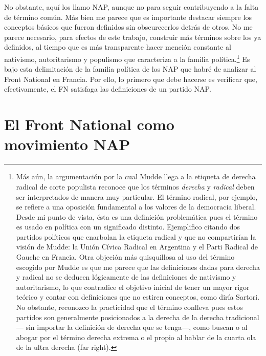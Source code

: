 No obstante, aquí los llamo NAP, aunque no para seguir contribuyendo a la falta de término común. Más bien me parece que es importante destacar siempre los conceptos básicos que fueron definidos sin obscurecerlos detrás de otros. No me parece necesario, para efectos de este trabajo, construir más términos sobre los ya definidos, al tiempo que es más transparente hacer mención constante al nativismo, autoritarismo y populismo que caracteriza a la familia política.\footnote{Más aún, la argumentación por la cual Mudde llega a la etiqueta de derecha radical de corte populista reconoce que los términos \textit{derecha} y \textit{radical} deben ser interpretados de manera muy particular. El término radical, por ejemplo, se refiere a una oposición fundamental a los valores de la democracia liberal. Desde mi punto de vista, ésta es una definición problemática pues el término es usado en política con un significado distinto. Ejemplifico citando dos partidos políticos que enarbolan la etiqueta radical y que no compartirían la visión de Mudde: la Unión Cívica Radical en Argentina y el Parti Radical de Gauche en Francia. Otra objeción más quisquillosa al uso del término escogido por Mudde es que me parece que las definiciones dadas para derecha y radical no se deducen lógicamente de las definiciones de nativismo y autoritarismo, lo que contradice el objetivo inicial de tener un mayor rigor teórico y contar con definiciones que no estiren conceptos, como diría Sartori. No obstante, reconozco la practicidad que el término conlleva pues estos partidos son generalmente posicionados a la derecha de la derecha tradicional--- sin importar la definición de derecha que se tenga---, como buscan \textcite{Mammone12} o \textcite{Hainsworth16a} al abogar por el término derecha extrema o el propio \textcite{Mudde19} al hablar de la cuarta ola de la ultra derecha (far right).} Es bajo esta delimitación de la familia política de los NAP que habré de analizar al Front National en Francia. Por ello, lo primero que debe hacerse es verificar que, efectivamente, el FN satisfaga las definiciones de un partido NAP. 

\section{El Front National como movimiento NAP}

